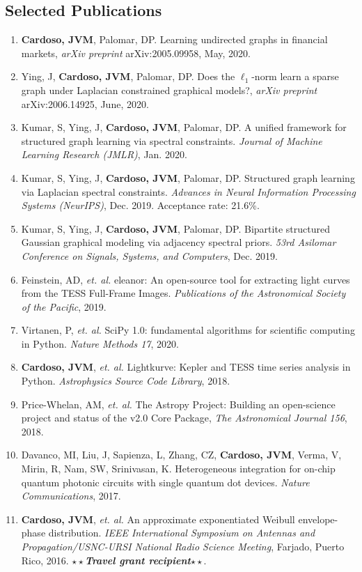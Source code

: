 \documentclass[10pt]{article}
\begin{document}
\begin{titlepage}
\section*{Selected Publications}
\begin{enumerate}
  \item \textbf{Cardoso, JVM}, Palomar, DP. Learning undirected graphs in financial markets, \textit{arXiv preprint} arXiv:2005.09958, May, 2020.
  \item Ying, J, \textbf{Cardoso, JVM}, Palomar, DP. Does the $\ell_1$-norm learn a sparse graph under Laplacian constrained graphical models?, \textit{arXiv preprint} arXiv:2006.14925, June, 2020.
  \item Kumar, S, Ying, J, \textbf{Cardoso, JVM}, Palomar, DP. A unified framework for structured graph
    learning via spectral constraints. \textit{Journal of Machine Learning Research (JMLR)}, Jan. 2020.
  \item Kumar, S, Ying, J, \textbf{Cardoso, JVM}, Palomar, DP. Structured graph learning via Laplacian
    spectral constraints. \textit{Advances in Neural Information Processing Systems (NeurIPS)}, Dec. 2019. Acceptance rate: 21.6\%.
  \item Kumar, S, Ying, J, \textbf{Cardoso, JVM}, Palomar, DP. Bipartite structured Gaussian graphical modeling via adjacency spectral priors. \textit{53rd Asilomar Conference on Signals, Systems, and Computers}, Dec. 2019.
  \item Feinstein, AD, \textit{et. al.} eleanor: An open-source tool for extracting light curves from the TESS Full-Frame Images. \textit{Publications of the Astronomical Society of the Pacific}, 2019.
  \item Virtanen, P, \textit{et. al.} SciPy 1.0: fundamental algorithms for scientific computing in Python. \textit{Nature Methods 17}, 2020.
  \item \textbf{Cardoso, JVM}, \textit{et. al.} Lightkurve: Kepler and TESS time series analysis in Python. \textit{Astrophysics Source Code Library}, 2018.
  \item Price-Whelan, AM, \textit{et. al.} The Astropy Project: Building an open-science project and status of the v2.0 Core Package, \textit{The Astronomical Journal 156}, 2018.
\item Davanco, MI, Liu, J, Sapienza, L, Zhang, CZ, \textbf{Cardoso, JVM}, Verma, V, Mirin, R, Nam,
SW, Srinivasan, K. Heterogeneous integration for on-chip quantum photonic circuits with single quantum dot devices.
\textit{Nature Communications}, 2017.
\item \textbf{Cardoso, JVM}, \textit{et. al.} An approximate exponentiated Weibull envelope-phase distribution.
\textit{IEEE International Symposium on Antennas and Propagation/USNC-URSI National Radio Science Meeting}, Farjado, Puerto Rico, 2016.
$\star\star$\textbf{\textit{Travel grant recipient}}$\star\star$.
\end{enumerate}


\end{titlepage}
\end{document}
